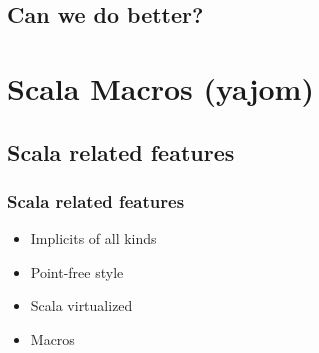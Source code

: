 \documentclass[14pt]{beamer}
\begin{document}
\subsection{Can we do better?}


\section{Scala Macros (yajom)}
\subsection{Scala related features}
\frame
{\frametitle{Scala related features}
\begin{itemize}
  \item Implicits of all kinds
  \item Point-free style
  \item Scala virtualized
  \item Macros
\end{itemize}
}
\end{document}
